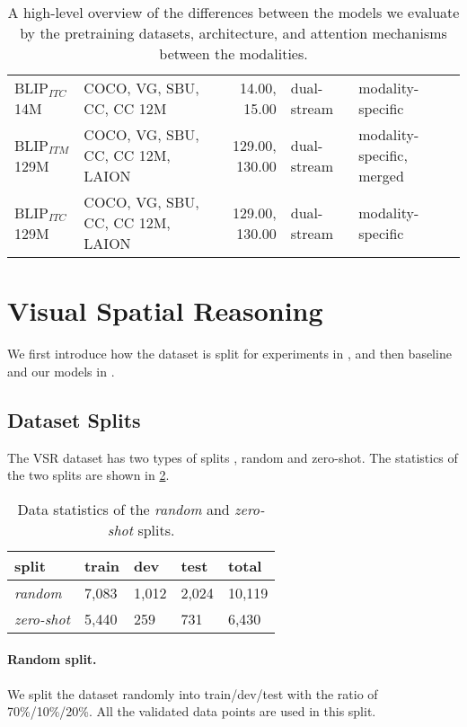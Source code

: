 \begin{table}[ht]
\begin{adjustbox}{max width=\textwidth}
\begin{tabular}{l|lr|l|l}
    BLIP$_{ITC}$ 14M \cite{li2022blip} &  COCO, VG, SBU, CC, CC 12M & 14.00, 15.00 &   dual-stream &         modality-specific \\
    BLIP$_{ITM}$ 129M \cite{li2022blip} & COCO, VG, SBU, CC, CC 12M, LAION & 129.00,   130.00 &   dual-stream & modality-specific, merged \\
    BLIP$_{ITC}$ 129M \cite{li2022blip} & COCO, VG, SBU, CC, CC 12M, LAION & 129.00,   130.00 &   dual-stream &         modality-specific \\
    \bottomrule
    \end{tabular}
    \end{adjustbox}
    \caption{A high-level overview of the differences between the models we evaluate by the pretraining datasets, architecture, and attention mechanisms between the modalities.}
    \label{tab:model-types}
\end{table}

\section{Visual Spatial Reasoning}

We first introduce how the dataset is split for experiments in , and then baseline and our models in .

\subsection{Dataset Splits}\label{sec:vsr_splits}

The VSR dataset has two types of splits \cite{liu2022visual}, random and zero-shot. The statistics of the two splits are shown in \cref{tab:data_splits}.

\begin{table}[ht]
\small
\centering
\begin{tabular}{lllll}
\toprule
 split & train & dev & test & total   \\
\midrule
\textit{random} & 7,083 & 1,012 & 2,024 & 10,119 \\
\textit{zero-shot} & 5,440 & 259 & 731  & 6,430\\
\bottomrule
\end{tabular}
\caption{Data statistics of the \textit{random} and \textit{zero-shot} splits. }
\label{tab:data_splits}
\end{table}

\paragraph{Random split.}
We split the dataset randomly into train/dev/test with the ratio of 70\%/10\%/20\%. All the validated data points are used in this split.

